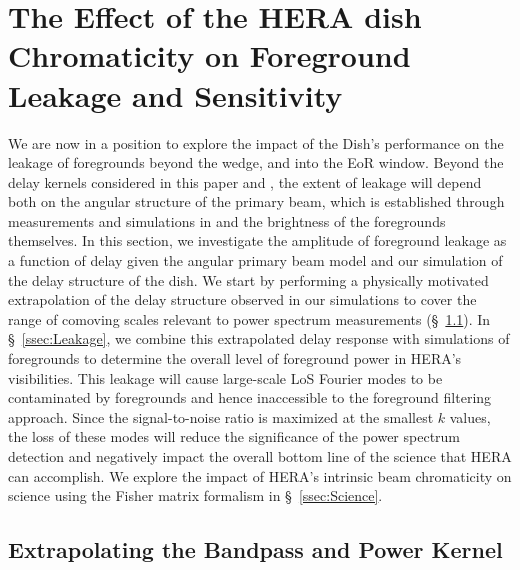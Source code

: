\documentclass[twocolumn]{emulateapj}
\begin{document}
\section{The Effect of the HERA dish Chromaticity on Foreground Leakage and Sensitivity}\label{sec:Sensitivity}
We are now in a position to explore the impact of the Dish's performance on the leakage of foregrounds beyond the wedge, and into the EoR window. Beyond the delay kernels considered in this paper and \citet{Patra:2016}, the extent of leakage will depend both on the angular structure of the primary beam, which is established through measurements and simulations in \citet{Neben:2016} and the brightness of the foregrounds themselves. In this section, we investigate the amplitude of foreground leakage as a function of delay given the angular primary beam model and our simulation of the delay structure of the dish. We start by performing a physically motivated extrapolation of the delay structure observed in our simulations to cover the range of comoving scales relevant to power spectrum measurements (\S~\ref{ssec:Extrapolation}). In \S~\ref{ssec:Leakage}, we combine this extrapolated delay response with simulations of foregrounds to determine the overall level of foreground power in HERA's visibilities. This leakage will cause large-scale LoS Fourier modes to be contaminated by foregrounds and hence inaccessible to the foreground filtering approach. Since the signal-to-noise ratio is maximized at the smallest $k$ values, the loss of these modes will reduce the significance of the power spectrum detection and negatively impact the overall bottom line of the science that HERA can accomplish. We explore the impact of HERA's intrinsic beam chromaticity on science using the Fisher matrix formalism in \S~\ref{ssec:Science}. 


\subsection{Extrapolating the Bandpass and Power Kernel}\label{ssec:Extrapolation}
\end{document}
